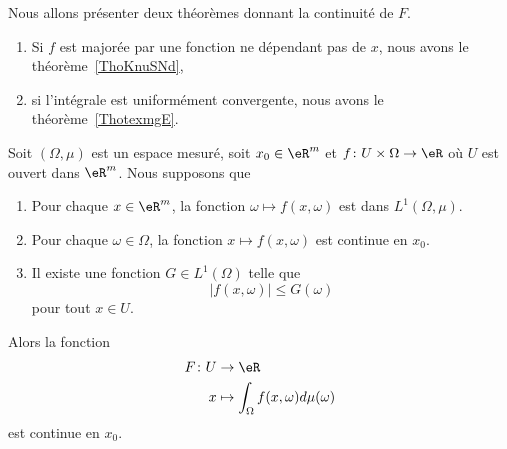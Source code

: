 Nous allons présenter deux théorèmes donnant la continuité de \( F\).
\begin{enumerate}
	\item
	      Si \( f\) est majorée par une fonction ne dépendant pas de \( x\), nous avons le théorème~\ref{ThoKnuSNd},
	\item
	      si l'intégrale est uniformément convergente, nous avons le théorème~\ref{ThotexmgE}.
\end{enumerate}

\begin{theorem} \label{ThoKnuSNd}
	Soit \( (\Omega,\mu)\) est un espace mesuré, soit \( x_0\in \eR^m\) et \( f\colon U\times \Omega\to \eR\) où \( U\) est ouvert dans \( \eR^m\). Nous supposons que
	\begin{enumerate}
		\item
		      Pour chaque \( x\in \eR^m\), la fonction \( \omega\mapsto f(x,\omega)\) est dans \( L^1(\Omega,\mu)\).
		\item
		      Pour chaque \( \omega\in \Omega\), la fonction \( x\mapsto f(x,\omega)\) est continue en \( x_0\).
		\item       \label{ItemNAuYNG}
		      Il existe une fonction \( G\in L^1(\Omega)\) telle que
		      \begin{equation}
			      | f(x,\omega) |\leq G(\omega)
		      \end{equation}
		      pour tout \( x\in U\).
	\end{enumerate}
	Alors la fonction
	\begin{equation}
		\begin{aligned}
			F\colon U & \to \eR                                      \\
			x         & \mapsto \int_{\Omega}f(x,\omega)d\mu(\omega)
		\end{aligned}
	\end{equation}
	est continue en \( x_0\).
\end{theorem}


